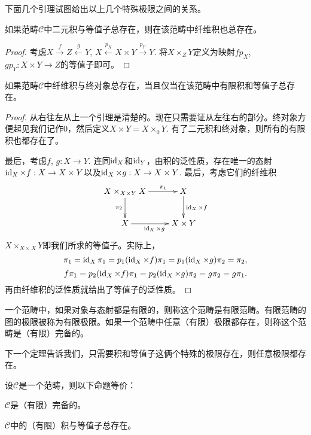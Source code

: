 下面几个引理试图给出以上几个特殊极限之间的关系。

\begin{lem}
如果范畴$\mathcal{C}$中二元积与等值子总存在，则在该范畴中纤维积也总存在。
\end{lem}

\begin{proof}
考虑$X\xrightarrow{f} Z \xleftarrow{g} Y$, $X\xleftarrow{p_X}X\times Y\xrightarrow{p_Y} Y$. 将$X\times_Z Y$定义为映射$fp_X$, $gp_Y: X\times Y\to Z$的等值子即可。
\end{proof}

\begin{lem}
如果范畴$\mathcal{C}$中纤维积与终对象总存在，当且仅当在该范畴中有限积和等值子总存在。
\end{lem}

\begin{proof}
从右往左从上一个引理是清楚的。现在只需要证从左往右的部分。终对象方便起见我们记作$0$，然后定义$X\times Y=X\times_0 Y$. 有了二元积和终对象，则所有的有限积也都存在了。

最后，考虑$f$, $g:X\to Y$. 连同$\operatorname{id}_X$和$\operatorname{id}_Y$，由积的泛性质，存在唯一的态射$\operatorname{id}_X\times f:X \to X\times Y$以及$\operatorname{id}_X\times g:X \to X\times Y$. 最后，考虑它们的纤维积
\[
\begin{xy}
	\xymatrix{
	X\times_{X\times Y} X\ar[d]_{\pi_2}\ar[r]^-{\pi_1}&X\ar[d]^{\id_X\times f}\\
	X\ar[r]_{\id_X\times g}& X\times Y
	}
\end{xy}
\]
$X\times_{X\times X} Y$即我们所求的等值子。实际上，
\[
	\pi_1=\operatorname{id}_X\pi_1=p_1(\operatorname{id}_X\times f)\pi_1=p_1(\operatorname{id}_X\times g)\pi_2=\pi_2,
\]
\[
	f\pi_1=p_2(\operatorname{id}_X\times f)\pi_1=p_2(\operatorname{id}_X\times g)\pi_2=g\pi_2=g\pi_1.
\]
再由纤维积的泛性质就给出了等值子的泛性质。
\end{proof}

\begin{para}
一个范畴中，如果对象与态射都是有限的，则称这个范畴是有限范畴。有限范畴的图的极限被称为有限极限。如果一个范畴中任意（有限）极限都存在，则称这个范畴是（有限）完备的。
\end{para}

下一个定理告诉我们，只需要积和等值子这俩个特殊的极限存在，则任意极限都存在。

\begin{thm}\label{wanbei}
设$\mathcal{C}$是一个范畴，则以下命题等价：
\begin{compactenum}[~~~~(1)]
\item $\mathcal{C}$是（有限）完备的。
\item $\mathcal{C}$中的（有限）积与等值子总存在。
\end{compactenum}
\end{thm}

